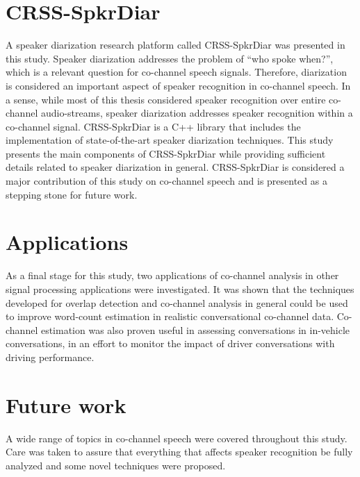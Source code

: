\section{CRSS-SpkrDiar}
A speaker diarization research platform called CRSS-SpkrDiar was presented in this study.
Speaker diarization addresses the problem of ``who spoke when?'', which is a relevant question for co-channel speech signals. 
Therefore, diarization is considered an important aspect of speaker recognition in co-channel speech. 
In a sense, while most of this thesis considered speaker recognition over entire co-channel audio-streams, speaker diarization addresses speaker recognition within a co-channel signal. 
CRSS-SpkrDiar is a C++ library that includes the implementation of state-of-the-art speaker diarization techniques. 
This study presents the main components of CRSS-SpkrDiar while providing sufficient details related to speaker diarization in general. 
CRSS-SpkrDiar is considered a major contribution of this study on co-channel speech and is presented as a stepping stone for future work. 

\section{Applications}
As a final stage for this study, two applications of co-channel analysis in other signal processing applications were investigated. 
It was shown that the techniques developed for overlap detection and co-channel analysis in general could be used to improve word-count estimation in realistic conversational co-channel data. 
Co-channel estimation was also proven useful in assessing conversations in in-vehicle conversations, in an effort to monitor the impact of driver conversations with driving performance. 


\section{Future work}
A wide range of topics in co-channel speech were covered throughout this study. 
Care was taken to assure that everything that affects speaker recognition be fully analyzed and some novel techniques were proposed. 

